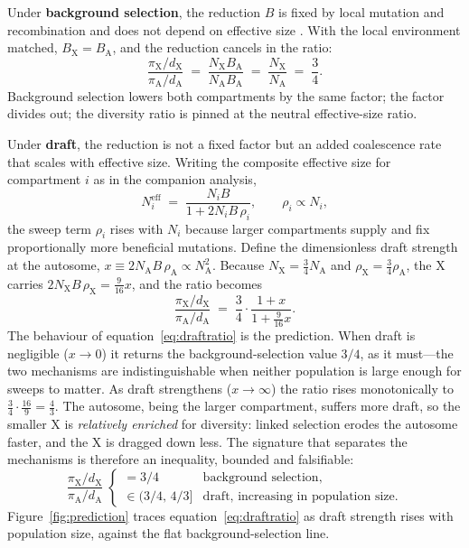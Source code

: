 \documentclass[11pt,a4paper]{article}
\newcommand{\NA}{N_{\mathrm{A}}}
\newcommand{\NX}{N_{\mathrm{X}}}
\begin{document}
Under \textbf{background selection}, the reduction $B$ is fixed by local mutation and recombination and does not depend on effective size \citep{ccc1993,nordborg1996}. With the local environment matched, $B_{\mathrm{X}} = B_{\mathrm{A}}$, and the reduction cancels in the ratio:
\begin{equation}
    \frac{\pi_{\mathrm{X}} / d_{\mathrm{X}}}{\pi_{\mathrm{A}} / d_{\mathrm{A}}}
    \;=\; \frac{\NX B_{\mathrm{A}}}{\NA B_{\mathrm{A}}}
    \;=\; \frac{\NX}{\NA} \;=\; \frac{3}{4}.
    \label{eq:bgsratio}
\end{equation}
Background selection lowers both compartments by the same factor; the factor divides out; the diversity ratio is pinned at the neutral effective-size ratio.

Under \textbf{draft}, the reduction is not a fixed factor but an added coalescence rate that scales with effective size. Writing the composite effective size for compartment $i$ as in the companion analysis,
\begin{equation}
    N_i^{\mathrm{eff}} \;=\; \frac{N_i B}{1 + 2 N_i B\, \rho_i}, \qquad \rho_i \propto N_i,
    \label{eq:composite}
\end{equation}
the sweep term $\rho_i$ rises with $N_i$ because larger compartments supply and fix proportionally more beneficial mutations. Define the dimensionless draft strength at the autosome, $x \equiv 2\NA B\,\rho_{\mathrm{A}} \propto \NA^{2}$. Because $\NX = \tfrac34\NA$ and $\rho_{\mathrm{X}} = \tfrac34\rho_{\mathrm{A}}$, the X carries $2\NX B\,\rho_{\mathrm{X}} = \tfrac{9}{16}x$, and the ratio becomes
\begin{equation}
    \frac{\pi_{\mathrm{X}} / d_{\mathrm{X}}}{\pi_{\mathrm{A}} / d_{\mathrm{A}}}
    \;=\; \frac{3}{4}\cdot\frac{1 + x}{1 + \tfrac{9}{16}x}.
    \label{eq:draftratio}
\end{equation}
The behaviour of equation~\eqref{eq:draftratio} is the prediction. When draft is negligible ($x \to 0$) it returns the background-selection value $3/4$, as it must---the two mechanisms are indistinguishable when neither population is large enough for sweeps to matter. As draft strengthens ($x \to \infty$) the ratio rises monotonically to $\tfrac34\cdot\tfrac{16}{9} = \tfrac43$. The autosome, being the larger compartment, suffers more draft, so the smaller X is \emph{relatively enriched} for diversity: linked selection erodes the autosome faster, and the X is dragged down less. The signature that separates the mechanisms is therefore an inequality, bounded and falsifiable:
\begin{equation}
    \frac{\pi_{\mathrm{X}} / d_{\mathrm{X}}}{\pi_{\mathrm{A}} / d_{\mathrm{A}}}
    \;\begin{cases}
    = 3/4 & \text{background selection,}\\[2pt]
    \in (3/4,\, 4/3] & \text{draft, increasing in population size.}
    \end{cases}
    \label{eq:inequality}
\end{equation}
Figure~\ref{fig:prediction} traces equation~\eqref{eq:draftratio} as draft strength rises with population size, against the flat background-selection line.
\end{document}
